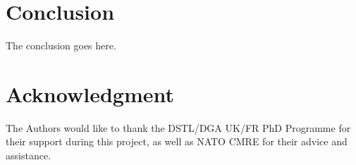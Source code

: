 %





\section{Conclusion}
The conclusion goes here.






\section*{Acknowledgment}

The Authors would like to thank the DSTL/DGA UK/FR PhD Programme for their support during this project, as well as NATO CMRE for their advice and assistance.






